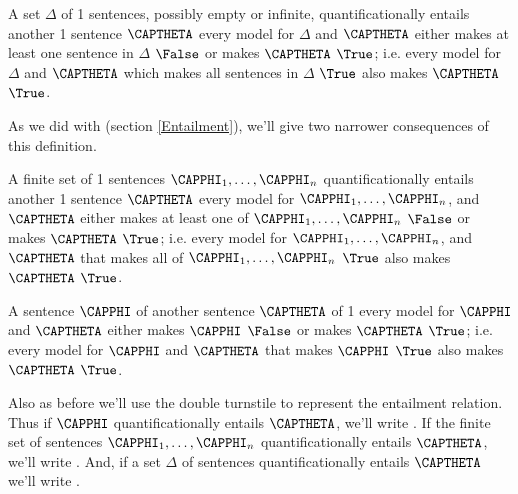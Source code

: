 \begin{majorILnc}{}
 A set $\Delta$ of \GQL{}1 sentences, possibly empty or infinite, quantificationally {entails} another \GQL{}1 sentence $\CAPTHETA$ \Iff every model for $\Delta$ and $\CAPTHETA$ either makes at least one sentence in $\Delta$ $\False$ or makes $\CAPTHETA$ $\True$; i.e. \Iff every model for $\Delta$ and $\CAPTHETA$ which makes all sentences in $\Delta$ $\True$ also makes $\CAPTHETA$ $\True$.
\end{majorILnc}

\noindent{}As we did with \GSL{} (section \ref{Entailment}), we'll give two narrower consequences of this definition. 

\begin{cenumerate}
\item A finite set of \GQL{}1 sentences $\CAPPHI_1,\ldots,\CAPPHI_{\integer{n}}$ quantificationally {entails} another \GQL{}1 sentence $\CAPTHETA$ \Iff every model for $\CAPPHI_1,\ldots,\CAPPHI_{\integer{n}}$, and $\CAPTHETA$ either makes at least one of $\CAPPHI_1,\ldots,\CAPPHI_{\integer{n}}$ $\False$ or makes $\CAPTHETA$ $\True$; i.e. \Iff every model for $\CAPPHI_1,\ldots,\CAPPHI_{\integer{n}}$, and $\CAPTHETA$ that makes all of $\CAPPHI_1,\ldots,\CAPPHI_{\integer{n}}$ $\True$ also makes $\CAPTHETA$ $\True$.
\item A sentence $\CAPPHI$ of \GQL{}  another sentence $\CAPTHETA$ of \GQL{}1 \Iff every model for $\CAPPHI$ and $\CAPTHETA$ either makes $\CAPPHI$ $\False$ or makes $\CAPTHETA$ $\True$; i.e. \Iff every model for $\CAPPHI$ and $\CAPTHETA$ that makes $\CAPPHI$ $\True$ also makes $\CAPTHETA$ $\True$.
\end{cenumerate}

\noindent{}Also as before we'll use the double turnstile to represent the entailment relation. 
Thus if $\CAPPHI$ quantificationally entails $\CAPTHETA$, we'll write \mention{$\CAPPHI\sdtstile{}{}\CAPTHETA$}. 
If the finite set of sentences  $\CAPPHI_1,\ldots,\CAPPHI_{\integer{n}}$ quantificationally {entails} $\CAPTHETA$, we'll write . 
And, if a set $\Delta$ of \GQL{} sentences quantificationally {entails} $\CAPTHETA$ we'll write \mention{$\Delta\sdtstile{}{}\CAPTHETA$}.

